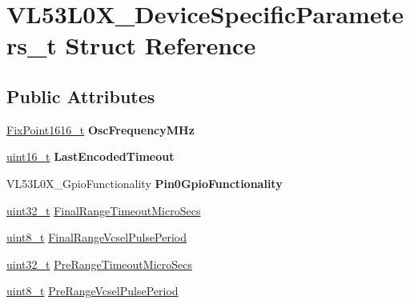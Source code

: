 \hypertarget{structVL53L0X__DeviceSpecificParameters__t}{}\section{V\+L53\+L0\+X\+\_\+\+Device\+Specific\+Parameters\+\_\+t Struct Reference}
\label{structVL53L0X__DeviceSpecificParameters__t}
\subsection*{Public Attributes}
\begin{DoxyCompactItemize}
\item 
\mbox{\label{structVL53L0X__DeviceSpecificParameters__t_ace2317e968e3d4498bcb6e2a42b3d907}} 
\hyperlink{vl53l0x__types_8h_afb910790161809fc76e1a274a6349384}{Fix\+Point1616\+\_\+t} {\bfseries Osc\+Frequency\+M\+Hz}
\item 
\mbox{\label{structVL53L0X__DeviceSpecificParameters__t_a8bf636fd23789af1fbb25de79ab5e6b5}} 
\hyperlink{vl53l0x__types_8h_a273cf69d639a59973b6019625df33e30}{uint16\+\_\+t} {\bfseries Last\+Encoded\+Timeout}
\item 
\mbox{\label{structVL53L0X__DeviceSpecificParameters__t_ac067dc3be897686cc43f4e404fdc6835}} 
V\+L53\+L0\+X\+\_\+\+Gpio\+Functionality {\bfseries Pin0\+Gpio\+Functionality}
\item 
\hyperlink{vl53l0x__types_8h_a435d1572bf3f880d55459d9805097f62}{uint32\+\_\+t} \hyperlink{structVL53L0X__DeviceSpecificParameters__t_a49b96750aa9ee22517caeb4a6a4e427c}{Final\+Range\+Timeout\+Micro\+Secs}
\item 
\hyperlink{vl53l0x__types_8h_aba7bc1797add20fe3efdf37ced1182c5}{uint8\+\_\+t} \hyperlink{structVL53L0X__DeviceSpecificParameters__t_a8d9221ba4a2fa8e41ee5fa4cd508775a}{Final\+Range\+Vcsel\+Pulse\+Period}
\item 
\hyperlink{vl53l0x__types_8h_a435d1572bf3f880d55459d9805097f62}{uint32\+\_\+t} \hyperlink{structVL53L0X__DeviceSpecificParameters__t_af80074bb5edaa5c233da27a52f5ef6c6}{Pre\+Range\+Timeout\+Micro\+Secs}
\item 
\hyperlink{vl53l0x__types_8h_aba7bc1797add20fe3efdf37ced1182c5}{uint8\+\_\+t} \hyperlink{structVL53L0X__DeviceSpecificParameters__t_af48c5594521944d9eaa1c5f893486bb3}{Pre\+Range\+Vcsel\+Pulse\+Period}

\end{DoxyCompactItemize}
